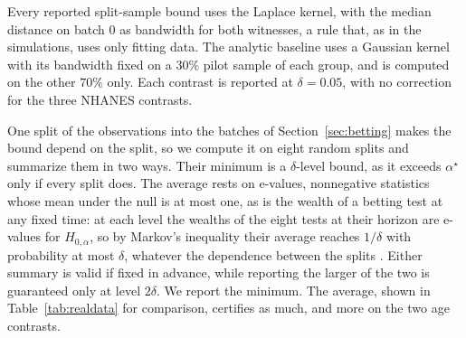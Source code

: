 Every reported split-sample bound uses the Laplace kernel, with the median distance on batch $0$ as bandwidth for both
witnesses, a rule that, as in the simulations, uses only fitting data. The analytic baseline uses a Gaussian kernel with its
bandwidth fixed on a $30\%$ pilot sample of each group, and is computed on the other $70\%$ only. Each contrast is
reported at $\delta=0.05$, with no correction for the three NHANES contrasts.

\begin{table}[t]
\centering
\small
\setlength{\tabcolsep}{2.3pt}

\caption{The two bounds on the four contrasts (the last three from NHANES), $\delta=0.05$, grid mesh $0.05$; $n,m$:
group sizes, of which the analytic baseline uses $70\%$ after a $30\%$ pilot. Analytic baseline: $\widehat D_0$ and
$\tau(0)$, its statistic and threshold at $\alpha=0$; $n_{\mathrm{fire}}$, the balanced size of \eqref{eq:samplesize};
$\alpha_{\mathrm{last}}$, the largest rejected grid level, and bisection, the largest level rejected when bisecting to
width $0.0125$ (Section~\ref{sec:alpha}), both at most the infimum \eqref{eq:alphaest}; `--': none. Split-sample
bound, Laplace kernel: the smallest bound over eight random splits and the level certified by the average of their
final wealths, each $\delta$-level for this kernel. The three NHANES statements hold jointly with probability at least
$1-3\delta$.}
\label{tab:realdata}
\end{table}

One split of the observations into the batches of Section~\ref{sec:betting} makes the bound depend on the split, so we
compute it on eight random splits and summarize them in two ways. Their minimum is a $\delta$-level bound, as it
exceeds $\alpha^\star$ only if every split does. The average rests on e-values, nonnegative statistics whose mean under
the null is at most one, as is the wealth of a betting test at any fixed time: at each level the wealths of the eight
tests at their horizon are e-values for $H_{0,\alpha}$, so by Markov's inequality their average reaches $1/\delta$
with probability at most $\delta$, whatever the dependence between the splits \citep{vovk2021evalues}. Either summary
is valid if fixed in advance, while reporting the larger of the two is guaranteed only at level $2\delta$. We report
the minimum. The average, shown in Table~\ref{tab:realdata} for comparison, certifies as much, and more on the two age
contrasts.

